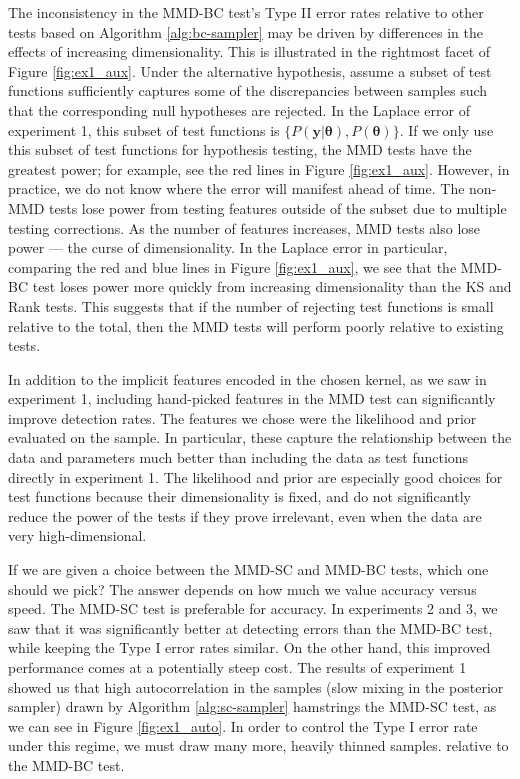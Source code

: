\documentclass[a4paper,11pt]{article}
\begin{document}
The inconsistency in the MMD-BC test's Type II error rates relative to other tests based on Algorithm \ref{alg:bc-sampler} may be driven by differences in the effects of increasing dimensionality. This is illustrated in the rightmost facet of Figure \ref{fig:ex1_aux}. Under the alternative hypothesis, assume a subset of test functions sufficiently captures some of the discrepancies between samples such that the corresponding null hypotheses are rejected. In the Laplace error of experiment 1, this subset of test functions is $\{P(\mathbf{y}|\mathbf{\theta}), P(\mathbf{\theta})\}$. If we only use this subset of test functions for hypothesis testing, the MMD tests have the greatest power; for example, see the red lines in Figure \ref{fig:ex1_aux}. However, in practice, we do not know where the error will manifest ahead of time. The non-MMD tests lose power from testing features outside of the subset due to multiple testing corrections. As the number of features increases, MMD tests also lose power \cite{reddi_decreasing_2014} --- the curse of dimensionality. In the Laplace error in particular, comparing the red and blue lines in Figure \ref{fig:ex1_aux}, we see that the MMD-BC test loses power more quickly from increasing dimensionality than the KS and Rank tests. This suggests that if the number of rejecting test functions is small relative to the total, then the MMD tests will perform poorly relative to existing tests. 

In addition to the implicit features encoded in the chosen kernel, as we saw in experiment 1, including hand-picked features in the MMD test can significantly improve detection rates. The features we chose were the likelihood and prior evaluated on the sample. In particular, these capture the relationship between the data and parameters much better than including the data as test functions directly in experiment 1. The likelihood and prior are especially good choices for test functions because their dimensionality is fixed, and do not significantly reduce the power of the tests if they prove irrelevant, even when the data are very high-dimensional.

If we are given a choice between the MMD-SC and MMD-BC tests, which one should we pick? The answer depends on how much we value accuracy versus speed. The MMD-SC test is preferable for accuracy. In experiments 2 and 3, we saw that it was significantly better at detecting errors than the MMD-BC test, while keeping the Type I error rates similar. On the other hand, this improved performance comes at a potentially steep cost. The results of experiment 1 showed us that high autocorrelation in the samples (slow mixing in the posterior sampler) drawn by Algorithm \ref{alg:sc-sampler} hamstrings the MMD-SC test, as we can see in Figure \ref{fig:ex1_auto}. In order to control the Type I error rate under this regime, we must draw many more, heavily thinned samples. relative to the MMD-BC test. 
\end{document}
